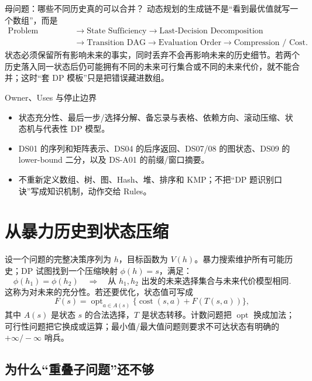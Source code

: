 \documentclass[UTF8,fontset=none,11pt,a4paper]{ctexart}
\begin{document}

\begin{corebox}{母问题：哪些不同历史真的可以合并？}
动态规划的生成链不是“看到最优值就写一个数组”，而是
\[
\begin{aligned}
\text{Problem Contract}
&\to\text{State Sufficiency}
\to\text{Last-Decision Decomposition}\\
&\to\text{Transition DAG}
\to\text{Evaluation Order}
\to\text{Compression / Cost}.
\end{aligned}
\]
状态必须保留所有影响未来的事实，同时丢弃不会再影响未来的历史细节。若两个历史落入同一状态后仍可能拥有不同的未来可行集合或不同的未来代价，就不能合并；这时“套 DP 模板”只是把错误藏进数组。
\end{corebox}

\begin{methodbox}{Owner、Uses 与停止边界}
\begin{itemize}
\item {}状态充分性、最后一步/选择分解、备忘录与表格、依赖方向、滚动压缩、状态机与代表性 DP 模型。
\item {}DS01 的序列和矩阵表示、DS04 的后序返回、DS07/08 的图状态、DS09 的 lower-bound 二分，以及 DS-A01 的前缀/窗口摘要。
\item {}不重新定义数组、树、图、Hash、堆、排序和 KMP；不把“DP 题识别口诀”写成知识机制，动作交给 Rules。
\end{itemize}
\end{methodbox}
\tableofcontents\newpage

\section{从暴力历史到状态压缩}

设一个问题的完整决策序列为 $h$，目标函数为 $V(h)$。暴力搜索维护所有可能历史；DP 试图找到一个压缩映射 $\phi(h)=s$，满足：
\[
\phi(h_1)=\phi(h_2)
\quad\Longrightarrow\quad
\text{从 }h_1,h_2\text{ 出发的未来选择集合与未来代价模型相同}.
\]
这称为对未来的充分性。若还要优化，状态值可写成
\[
F(s)=\operatorname{opt}_{a\in A(s)}\{\operatorname{cost}(s,a)+F(T(s,a))\},
\]
其中 $A(s)$ 是状态 $s$ 的合法选择，$T$ 是状态转移。计数问题把 $\operatorname{opt}$ 换成加法；可行性问题把它换成或运算；最小值/最大值问题则要求不可达状态有明确的 $+\infty/-\infty$ 哨兵。

\subsection{为什么“重叠子问题”还不够}
\end{document}
